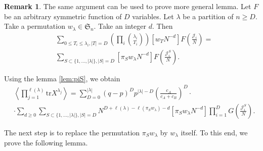 \documentclass{article}
\newcommand{\tr}{\mathrm{tr}}
\theoremstyle{plain}
\theoremstyle{definition}
\newtheorem{remark}[thm]{Remark}
\numberwithin{equation}{section}
\begin{document}
\begin{remark}
    The same argument can be used to prove more general lemma.
    Let $F$ be an arbitrary symmetric function of $D$ variables. Let $\lambda$ be a partition of $n \ge D$. Take a permutation $w_\lambda \in \mathfrak{S}_n$. Take an integer $d$. Then
    \begin{equation}
        \begin{aligned}
            & \sum_{0 \le T_{i} \le \lambda_{i}, |T| = D} \left(\prod_{i} \binom{\lambda_{i}}{T_{i}} \right)  [w_{T} N^{-d}] F\left(\frac{\mathcal{J}_{i}}{N} \right) = \\
            & \sum_{S \subset \{1,...,|\lambda|\}, |S| = D} [\pi_S w_\lambda N^{-d}] F\left(\frac{\mathcal{J}_{i}^S}{N} \right).
        \end{aligned}
    \end{equation}
\end{remark}

Using the lemma \ref{lem:piS}, we obtain
\begin{equation}
    \label{eq:Xpq_piS}
    \begin{aligned}
        & \left\langle \prod_{j=1}^{\ell(\lambda)} \tr X^{\lambda_{j}} \right\rangle = \sum_{D=0}^{|\lambda|} (q-p)^{D} p^{|\lambda|-D} \left(\frac{c_{A}}{c_{A}+c_{B}}\right)^{D} \cdot \\
        & \cdot \sum\limits_{d\ge 0} \sum_{S\subset \{1,\dots,|\lambda|\}, |S| = D}  N^{D+\ell(\lambda) - \ell(\pi_S w_\lambda)-d} [\pi_S w_\lambda N^{-d}] \prod_{i=1}^{D} G\left(\frac{\mathcal{J}_{i}^S}{N} \right).
    \end{aligned}
\end{equation}

The next step is to replace the permutation $\pi_S w_\lambda$ by $w_\lambda$ itself. To this end, we prove the following lemma.
\end{document}
